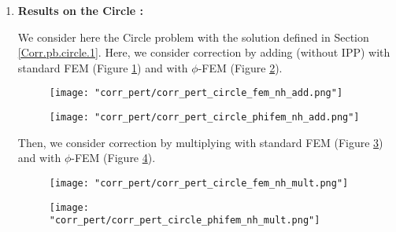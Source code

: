 \begin{enumerate}[label=\textbullet]
	\item \textbf{Results on the Circle :}
	
	We consider here the Circle problem with the solution defined in Section \ref{Corr.pb.circle.1}. Here, we consider correction by adding (without IPP) with standard FEM (Figure \ref{corr_pert_circle_fem_nh_add}) and with $\phi$-FEM (Figure \ref{corr_pert_circle_phifem_nh_add}).
	
	\begin{minipage}{0.48\linewidth}
		\begin{figure}[H]
			\centering
			\texttt{[image: "corr\_pert/corr\_pert\_circle\_fem\_nh\_add.png"]}
			\label{corr_pert_circle_fem_nh_add}
		\end{figure} 
	\end{minipage}
	\begin{minipage}{0.48\linewidth}
		\begin{figure}[H]
			\centering
			\texttt{[image: "corr\_pert/corr\_pert\_circle\_phifem\_nh\_add.png"]}
			\label{corr_pert_circle_phifem_nh_add}
		\end{figure} 
	\end{minipage}
	
	Then, we consider correction by multiplying with standard FEM (Figure \ref{corr_pert_circle_fem_nh_mult}) and with $\phi$-FEM (Figure \ref{corr_pert_circle_phifem_nh_mult}).
	
	\begin{minipage}{0.48\linewidth}
		\begin{figure}[H]
			\centering
			\texttt{[image: "corr\_pert/corr\_pert\_circle\_fem\_nh\_mult.png"]}
			\label{corr_pert_circle_fem_nh_mult}
		\end{figure} 
	\end{minipage}
	\begin{minipage}{0.48\linewidth}
		\begin{figure}[H]
			\centering
			\texttt{[image: "corr\_pert/corr\_pert\_circle\_phifem\_nh\_mult.png"]}
			\label{corr_pert_circle_phifem_nh_mult}
		\end{figure} 
	\end{minipage}
	

\end{enumerate}
